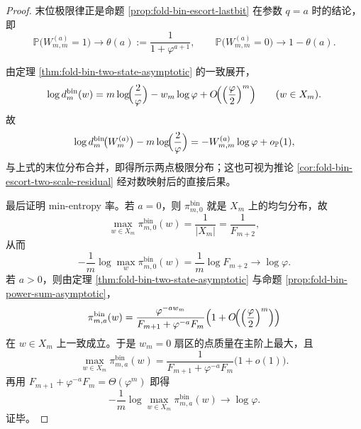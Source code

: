 \begin{proof}
末位极限律正是命题 \ref{prop:fold-bin-escort-lastbit} 在参数 \(q=a\) 时的结论，即
\[
\mathbb{P}\bigl(W^{(a)}_{m,m}=1\bigr)\to \theta(a):=\frac{1}{1+\varphi^{a+1}},
\qquad
\mathbb{P}\bigl(W^{(a)}_{m,m}=0\bigr)\to 1-\theta(a).
\]

由定理 \ref{thm:fold-bin-two-state-asymptotic} 的一致展开，
\[
\log d_m^{\mathrm{bin}}(w)
=m\log\!\Bigl(\frac{2}{\varphi}\Bigr)-w_m\log\varphi+O\!\Bigl(\Bigl(\frac{\varphi}{2}\Bigr)^m\Bigr)
\qquad (w\in X_m).
\]
故
\[
\log d_m^{\mathrm{bin}}\!\bigl(W_m^{(a)}\bigr)-m\log\!\Bigl(\frac{2}{\varphi}\Bigr)
=-W^{(a)}_{m,m}\log\varphi+o_{\mathbb P}(1),
\]
与上式的末位分布合并，即得所示两点极限分布；这也可视为推论 \ref{cor:fold-bin-escort-two-scale-residual} 经对数映射后的直接后果。

最后证明 min-entropy 率。若 \(a=0\)，则 \(\pi_{m,0}^{\mathrm{bin}}\) 就是 \(X_m\) 上的均匀分布，故
\[
\max_{w\in X_m}\pi_{m,0}^{\mathrm{bin}}(w)=\frac{1}{|X_m|}=\frac{1}{F_{m+2}},
\]
从而
\[
-\frac1m\log\max_{w}\pi_{m,0}^{\mathrm{bin}}(w)
=\frac{1}{m}\log F_{m+2}\longrightarrow \log\varphi.
\]
若 \(a>0\)，则由定理 \ref{thm:fold-bin-two-state-asymptotic} 与命题 \ref{prop:fold-bin-power-sum-asymptotic}，
\[
\pi_{m,a}^{\mathrm{bin}}(w)
=\frac{\varphi^{-a w_m}}{F_{m+1}+\varphi^{-a}F_m}\Bigl(1+O\!\Bigl(\Bigl(\frac{\varphi}{2}\Bigr)^m\Bigr)\Bigr)
\]
在 \(w\in X_m\) 上一致成立。于是 \(w_m=0\) 扇区的点质量在主阶上最大，且
\[
\max_{w\in X_m}\pi_{m,a}^{\mathrm{bin}}(w)
=\frac{1}{F_{m+1}+\varphi^{-a}F_m}\bigl(1+o(1)\bigr).
\]
再用 \(F_{m+1}+\varphi^{-a}F_m=\Theta(\varphi^m)\) 即得
\[
-\frac1m\log\max_{w\in X_m}\pi_{m,a}^{\mathrm{bin}}(w)\to \log\varphi.
\]
证毕。
\end{proof}

